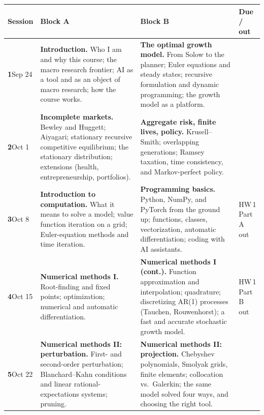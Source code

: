 \documentclass[11pt]{article}
\begin{document}
{\small
\renewcommand{\arraystretch}{1.25}
\begin{longtable}{@{}>{\raggedright\arraybackslash}p{1.3cm}>{\raggedright\arraybackslash}p{5.75cm}>{\raggedright\arraybackslash}p{5.75cm}>{\raggedright\arraybackslash}p{2.25cm}@{}}
\toprule
\textbf{Session} & \textbf{Block A} & \textbf{Block B} & \textbf{Due / out} \\
\midrule
\endhead
\textbf{1}\newline Sep 24 &
\textbf{Introduction.} Who I am and why this course; the macro research frontier; AI as a tool and as an object of macro research; how the course works. &
\textbf{The optimal growth model.} From Solow to the planner; Euler equations and steady states; recursive formulation and dynamic programming; the growth model as a platform. & \\
\textbf{2}\newline Oct 1 &
\textbf{Incomplete markets.} Bewley and Huggett; Aiyagari; stationary recursive competitive equilibrium; the stationary distribution; extensions (health, entrepreneurship, portfolios). &
\textbf{Aggregate risk, finite lives, policy.} Krusell--Smith; overlapping generations; Ramsey taxation, time consistency, and Markov-perfect policy. & \\
\textbf{3}\newline Oct 8 &
\textbf{Introduction to computation.} What it means to solve a model; value function iteration on a grid; Euler-equation methods and time iteration. &
\textbf{Programming basics.} Python, NumPy, and PyTorch from the ground up; functions, classes, vectorization, automatic differentiation; coding with AI assistants. & HW\,1 Part A out \\
\textbf{4}\newline Oct 15 &
\textbf{Numerical methods I.} Root-finding and fixed points; optimization; numerical and automatic differentiation. &
\textbf{Numerical methods I (cont.).} Function approximation and interpolation; quadrature; discretizing AR(1) processes (Tauchen, Rouwenhorst); a fast and accurate stochastic growth model. & HW\,1 Part B out \\
\textbf{5}\newline Oct 22 &
\textbf{Numerical methods II: perturbation.} First- and second-order perturbation; Blanchard--Kahn conditions and linear rational-expectations systems; pruning. &
\textbf{Numerical methods II: projection.} Chebyshev polynomials, Smolyak grids, finite elements; collocation vs.\ Galerkin; the same model solved four ways, and choosing the right tool. & \\

\end{longtable}}
\end{document}
